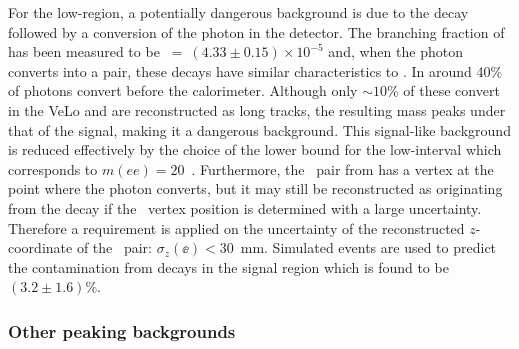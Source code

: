 For the low-\qsq region, a potentially dangerous background is due to the \BdToKstG decay followed by a conversion
of the photon in the detector. The branching fraction of \BdToKstG has been measured to be \mbox{\BF~= $(4.33 \pm 0.15)\times 10^{-5}$} and, 
when the photon converts into a \ee\! pair, these decays have similar characteristics to \mbox{\BdKstee}. 
In \lhcb around 40\% of photons convert before the calorimeter. Although only $\sim 10\%$ of these convert
in the VeLo and are reconstructed as long tracks, the resulting \Bd mass peaks under that of the signal, making it a dangerous background. 
This signal-like background is reduced effectively by the choice of the lower bound for the low-\qsq interval which corresponds to 
$m(ee)=20$~\mevcc. Furthermore, the \ee~pair from \BdToKstGee has a vertex at the point where the photon converts, but it may 
still be reconstructed as originating from the \Bd decay if the \ee~vertex position is determined with a large uncertainty. 
Therefore a requirement is applied on the uncertainty of the reconstructed $z$-coordinate of the \ee~pair: $\sigma_z(\ee) < 30$~mm.
Simulated events are used to predict the contamination from \BdToKstGee decays in the signal region which is found to be $(3.2\pm1.6)\%$.



\subsubsection{Other peaking backgrounds}


